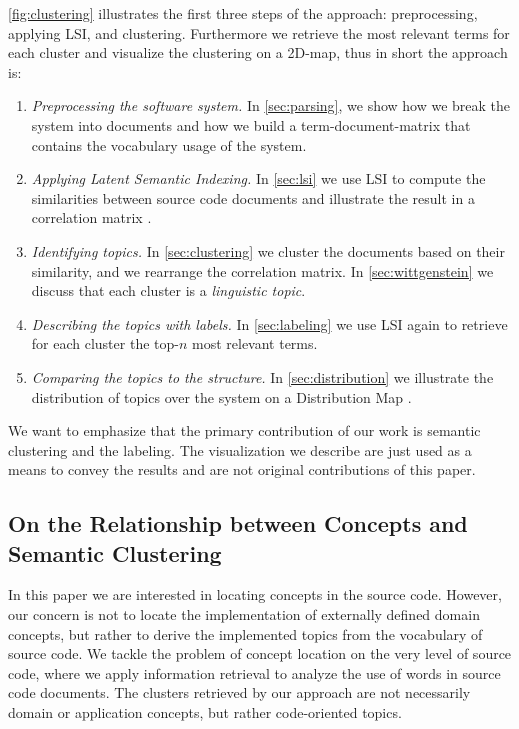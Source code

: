 \documentclass[10pt]{book}
\begin{document}
\autoref{fig:clustering} illustrates the first three steps of the approach: preprocessing, applying LSI, and clustering. Furthermore we retrieve the most relevant terms for each cluster and visualize the clustering on a 2D-map, thus in short the approach is:

\begin{enumerate}
  \item \emph{Preprocessing the software system.} In \autoref{sec:parsing}, we show how we break the system into documents and how we build a term-document-matrix that contains the vocabulary usage of the system.
  \item \emph{Applying Latent Semantic Indexing.} In \autoref{sec:lsi} we use LSI to compute the similarities between source code documents and illustrate the result in a correlation matrix \cite{Ling73a}.
  \item \emph{Identifying topics.} In \autoref{sec:clustering} we cluster the documents based on their similarity, and we rearrange the correlation matrix. In \autoref{sec:wittgenstein} we discuss that each cluster is a \emph{linguistic topic}.
  \item \emph{Describing the topics with labels.} In \autoref{sec:labeling} we use LSI again to retrieve for each cluster the top-$n$ most relevant terms.
  \item \emph{Comparing the topics to the structure.} In \autoref{sec:distribution} we illustrate the distribution of topics over the system on a Distribution Map \cite{Duca06c}.
\end{enumerate}

We want to emphasize that the primary contribution of our work is semantic clustering and the labeling. The visualization we describe are just used as a means to convey the results and are not original contributions of this paper.

\subsection{On the Relationship between Concepts and Semantic Clustering}\label{sec:wittgenstein}

In this paper we are interested in locating concepts in the source code. However, our concern is not to locate the implementation of externally defined domain concepts, but rather to derive the implemented topics from the vocabulary of source code. We tackle the problem of concept location on the very level of source code, where we apply information retrieval to analyze the use of words in source code documents. The clusters retrieved by our approach are not necessarily domain or application concepts, but rather code-oriented topics.
\end{document}
